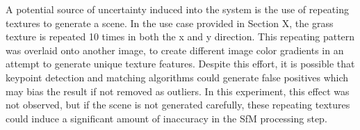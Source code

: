 A potential source of uncertainty induced into the system is the use of repeating textures to generate a scene.  In the use case provided in Section X, the grass texture is repeated 10 times in both the x and y direction.  This repeating pattern was overlaid onto another image, to create different image color gradients in an attempt to generate unique texture features.  Despite this effort, it is possible that keypoint detection and matching algorithms could generate false positives which may bias the result if not removed as outliers.  In this experiment, this effect was not observed, but if the scene is not generated carefully, these repeating textures could induce a significant amount of inaccuracy in the SfM processing step.
